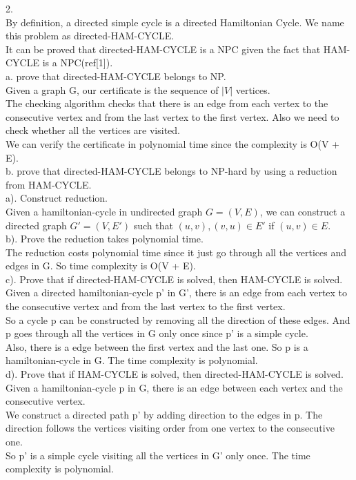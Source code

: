 \documentclass[a4paper]{article}
\begin{document}
2.\\
By definition, a directed simple cycle is a directed Hamiltonian Cycle. We name this problem as directed-HAM-CYCLE.\\
It can be proved that directed-HAM-CYCLE is a NPC given the fact that HAM-CYCLE is a NPC(ref[1]).\\
a. prove that directed-HAM-CYCLE belongs to NP.\\
Given a graph G, our certificate is the sequence of $|V|$ vertices.\\
The checking algorithm checks that there is an edge from each vertex to the consecutive vertex and from the last vertex to the first vertex. Also we need to check whether all the vertices are visited.\\
We can verify the certificate in polynomial time since the complexity is O(V + E).\\
b. prove that directed-HAM-CYCLE belongs to NP-hard by using a reduction from HAM-CYCLE.\\
a). Construct reduction.\\
Given a hamiltonian-cycle in undirected graph $G = (V, E)$, we can construct a directed graph $G' = (V, E')$ such that $(u, v), (v, u) \in E'$ if $(u, v) \in E$.\\
b). Prove the reduction takes polynomial time.\\
The reduction costs polynomial time since it just go through all the vertices and edges in G. So time complexity is O(V + E).\\
c). Prove that if directed-HAM-CYCLE is solved, then HAM-CYCLE is solved.\\
Given a directed hamiltonian-cycle p' in G', there is an edge from each vertex to the consecutive vertex and from the last vertex to the first vertex. \\
So a cycle p can be constructed by removing all the direction of these edges. And p goes through all the vertices in G only once since p' is a simple cycle. \\
Also, there is a edge between the first vertex and the last one. So p is a hamiltonian-cycle in G. The time complexity is polynomial.\\
d). Prove that if HAM-CYCLE is solved, then directed-HAM-CYCLE is solved.\\
Given a hamiltonian-cycle p in G, there is an edge between each vertex and the consecutive vertex.\\
We construct a directed path p' by adding direction to the edges in p. The direction follows the vertices visiting order from one vertex to the consecutive one.\\
So p' is a simple cycle visiting all the vertices in G' only once. The time complexity is polynomial.\\
\end{document}
